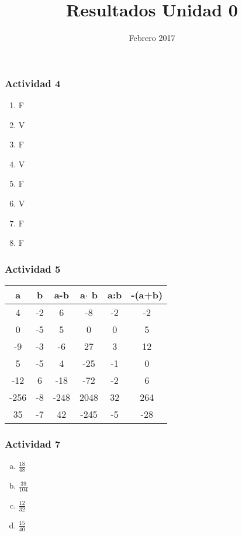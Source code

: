 \documentclass[a4paper, twocolumn]{article}
\title{Resultados Unidad 0}
\date{Febrero 2017}
\begin{document}
\maketitle
\subsubsection*{Actividad 4}
\begin{enumerate}[1)]
\item{F}
\item{V}
\item{F}
\item{V}
\item{F}
\item{V}
\item{F}
\item{F}
\end{enumerate}
\subsubsection*{Actividad 5}
\begin{table}[h]
\centering

\label{my-label}
\begin{tabular}{@{}cccccc@{}}
\toprule
a    & b  & a-b  & a$\cdot$ b   & a:b & -(a+b) \\ \midrule
4    & -2 & 6    & -8   & -2  & -2     \\
0    & -5 & 5    & 0    & 0   & 5      \\
-9   & -3 & -6   & 27   & 3   & 12     \\
5    & -5 & 4    & -25  & -1  & 0      \\
-12  & 6  & -18  & -72  & -2  & 6      \\
-256 & -8 & -248 & 2048 & 32  & 264    \\
35   & -7 & 42   & -245 & -5  & -28   
\end{tabular}
\end{table}



\subsubsection*{Actividad 7}
\begin{enumerate}[a)]
\item $\frac{18}{48}$
\item $\frac{39}{104}$
\item $\frac{12}{32}$
\item $\frac{15}{40}$
\end{enumerate}
\end{document}
